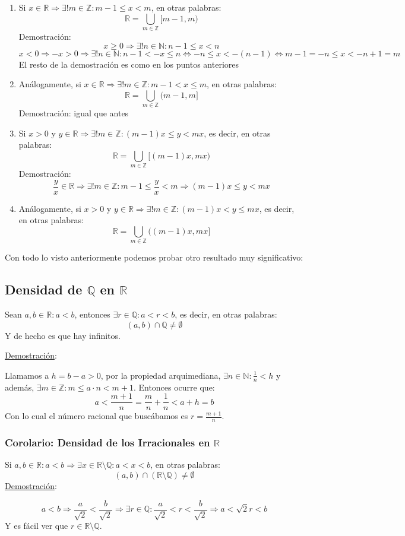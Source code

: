 \documentclass[10pt,a4paper,openright]{book}
\theoremstyle{break}
\begin{document}
\begin{enumerate}
\item Si $x\in \mathbb R\Rightarrow \exists! m \in \mathbb Z: m-1\leq x < m$, en otras palabras:
$$\mathbb R =\bigcup_{m\in \mathbb Z}[m-1,m)$$
Demostración:
$$x\geq 0\Rightarrow \exists! n \in \mathbb N : n-1\leq x<n$$
$$x<0\Rightarrow -x>0 \Rightarrow \exists! n \in \mathbb N: n-1<-x\leq n\Leftrightarrow -n\leq x< -(n-1)\Leftrightarrow m-1=-n\leq x< -n+1=m$$
El resto de la demostración es como en los puntos anteriores
\vspace{0.15cm}

\item Análogamente, si $x\in \mathbb R\Rightarrow \exists! m \in \mathbb Z: m-1< x\leq m$, en otras palabras:
$$\mathbb R =\bigcup_{m\in \mathbb Z}(m-1,m]$$
Demostración: igual que antes
\vspace{0.15cm}

\item Si $x>0$ y $y\in \mathbb R\Rightarrow \exists! m \in \mathbb Z: (m-1)x\leq y <mx$, es decir, en otras palabras:
$$\mathbb R= \bigcup_{m\in \mathbb Z}[(m-1)x, mx)$$
Demostración:
$$\frac{y}{x}\in \mathbb R\Rightarrow \exists! m \in \mathbb Z: m-1\leq \frac{y}{x}< m\Rightarrow (m-1)x\leq y< mx$$
\vspace{0.15cm}

\item Análogamente, si $x>0$ y $y\in \mathbb R\Rightarrow \exists! m \in \mathbb Z: (m-1)x< y \leq mx$, es decir, en otras palabras:
$$\mathbb R= \bigcup_{m\in \mathbb Z}((m-1)x, mx]$$
\end{enumerate}

Con todo lo visto anteriormente podemos probar otro resultado muy significativo:
\subsection{Densidad de $\mathbb Q$ en $\mathbb R$}
Sean $a,b\in \mathbb R: a<b$, entonces $\exists r\in \mathbb Q: a<r<b$, es decir, en otras palabras:
$$(a,b)\cap \mathbb Q\neq \emptyset$$
Y de hecho es que hay infinitos.\par

\underline{Demostración}:\par
Llamamos a $h=b-a>0$, por la propiedad arquimediana, $\exists n \in \mathbb N: \frac{1}{n}<h$ y además, $\exists m \in \mathbb Z: m\leq a\cdot n< m+1$. Entonces ocurre que:
$$a<\frac{m+1}{n}=\frac{m}{n}+\frac{1}{n}< a+ h=b$$
Con lo cual el número racional que buscábamos es $r=\frac{m+1}{n}$.

\subsubsection{Corolario: Densidad de los Irracionales en $\mathbb R$}
Si $a,b\in \mathbb R: a<b\Rightarrow \exists x\in \mathbb R\mbox{\textbackslash} \mathbb Q: a<x<b$, en otras palabras:
$$(a,b)\cap (\mathbb R\mbox{\textbackslash} \mathbb Q)\neq \emptyset$$
\underline{Demostración}:\par
$$a<b\Rightarrow \frac{a}{\sqrt{2}}< \frac{b}{\sqrt{2}}\Rightarrow \exists r \in \mathbb Q: \frac{a}{\sqrt{2}}<r<\frac{b}{\sqrt{2}}\Rightarrow a <\sqrt{2}r<b$$
Y es fácil ver que $r\in \mathbb R\mbox{\textbackslash}\mathbb Q$.
\end{document}
